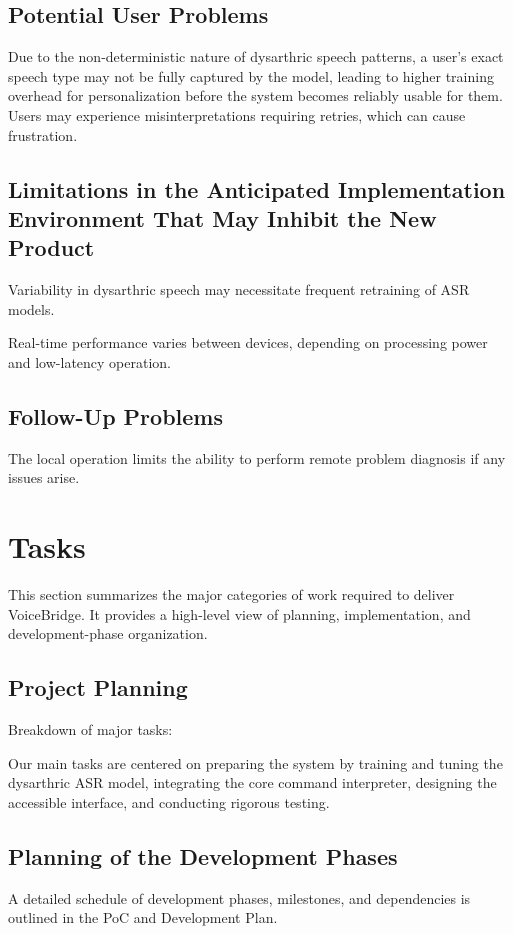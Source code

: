 \documentclass[11pt]{article}
\begin{document}
\subsection{Potential User Problems}
Due to the non-deterministic nature of dysarthric speech patterns, a user’s exact speech type may not be fully captured by the model, leading to higher training overhead for personalization before the system becomes reliably usable for them. Users may experience misinterpretations requiring retries, which can cause frustration.

\subsection{Limitations in the Anticipated Implementation Environment That May
Inhibit the New Product}
Variability in dysarthric speech may necessitate frequent retraining of ASR models.

Real-time performance varies between devices, depending on processing power and low-latency operation.
\subsection{Follow-Up Problems}
The local operation limits the ability to perform remote problem diagnosis if any issues arise.


\section{Tasks}
This section summarizes the major categories of work required to deliver VoiceBridge. It provides a high-level view of planning, implementation, and development-phase organization.

\subsection{Project Planning}
Breakdown of major tasks:

Our main tasks are centered on preparing the system by training and tuning the dysarthric ASR model, integrating the core command interpreter, designing the accessible interface, and conducting rigorous testing.
\subsection{Planning of the Development Phases}
A detailed schedule of development phases, milestones, and dependencies is outlined in the PoC and Development Plan.
\end{document}
